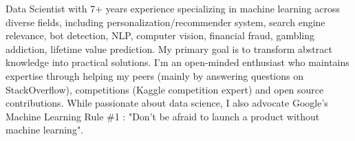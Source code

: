 

\begin{cvparagraph}

Data Scientist with 7+ years experience specializing in machine learning across diverse fields, including personalization/recommender system, search engine relevance, bot detection, NLP, computer vision, financial fraud, gambling addiction, lifetime value prediction. My primary goal is to transform abstract knowledge into practical solutions. I'm an open-minded enthusiast who maintains expertise through helping my peers (mainly by answering questions on StackOverflow), competitions (Kaggle competition expert) and open source contributions. While passionate about data science, I also advocate Google's Machine Learning Rule \#1 : "Don’t be afraid to launch a product without machine learning".
\end{cvparagraph}

